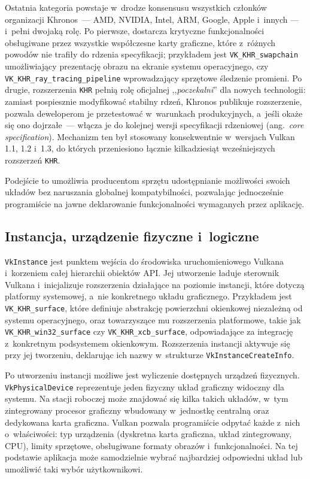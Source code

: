 Ostatnia kategoria powstaje w~drodze konsensusu wszystkich członków organizacji Khronos~---
AMD, NVIDIA, Intel, ARM, Google, Apple i~innych --- i~pełni dwojaką rolę.
Po pierwsze, dostarcza krytyczne funkcjonalności obsługiwane przez wszystkie współczesne karty graficzne,
które z~różnych powodów nie trafiły do rdzenia specyfikacji; przykładem jest \texttt{VK\_KHR\_swapchain}
umożliwiający prezentację obrazu na ekranie systemu operacyjnego, czy \texttt{VK\_KHR\_ray\_tracing\_pipeline}
wprowadzający sprzętowe śledzenie promieni.
Po drugie, rozszerzenia \texttt{KHR} pełnią rolę oficjalnej ,,\textit{poczekalni}'' dla nowych technologii:
zamiast pospiesznie modyfikować stabilny rdzeń, Khronos publikuje rozszerzenie, pozwala deweloperom
je przetestować w~warunkach produkcyjnych, a~jeśli okaże się ono dojrzałe~--- włącza je do kolejnej
wersji specyfikacji rdzeniowej (ang.~\textit{core specification}). Mechanizm ten był stosowany konsekwentnie 
w~wersjach Vulkan 1.1, 1.2 i~1.3, do których przeniesiono łącznie kilkadziesiąt wcześniejszych rozszerzeń \texttt{KHR}.

Podejście to umożliwia producentom sprzętu udostępnianie możliwości swoich układów
bez naruszania globalnej kompatybilności, pozwalając jednocześnie programiście na jawne deklarowanie
funkcjonalności wymaganych przez aplikację.

\subsection{Instancja, urządzenie fizyczne i~logiczne}
\label{sec:vulkan_hierarchy}

\texttt{VkInstance} jest punktem wejścia do środowiska uruchomieniowego Vulkana
i~korzeniem całej hierarchii obiektów API. Jej utworzenie ładuje sterownik Vulkana
i~inicjalizuje rozszerzenia działające na poziomie instancji, które dotyczą
platformy systemowej, a~nie konkretnego układu graficznego. Przykładem jest
\texttt{VK\_KHR\_surface}, które definiuje abstrakcję powierzchni okienkowej niezależną
od systemu operacyjnego, oraz towarzyszące mu rozszerzenia platformowe, takie jak
\texttt{VK\_KHR\_win32\_surface} czy \texttt{VK\_KHR\_xcb\_surface}, odpowiadające
za integrację z~konkretnym podsystemem okienkowym. Rozszerzenia instancji
aktywuje się przy jej tworzeniu, deklarując ich nazwy w~strukturze \texttt{VkInstanceCreateInfo}.

Po utworzeniu instancji możliwe jest wyliczenie dostępnych urządzeń fizycznych.
\texttt{VkPhysicalDevice} reprezentuje jeden fizyczny układ graficzny widoczny dla systemu.
Na stacji roboczej może znajdować się kilka takich układów, w~tym zintegrowany procesor 
graficzny wbudowany w~jednostkę centralną oraz dedykowana karta graficzna. Vulkan pozwala
programiście odpytać każde z~nich o~właściwości: typ urządzenia (dyskretna karta graficzna,
układ zintegrowany, CPU), limity sprzętowe, obsługiwane formaty obrazów i~funkcjonalności.
Na tej podstawie aplikacja może samodzielnie wybrać najbardziej odpowiedni układ lub
umożliwić taki wybór użytkownikowi.

